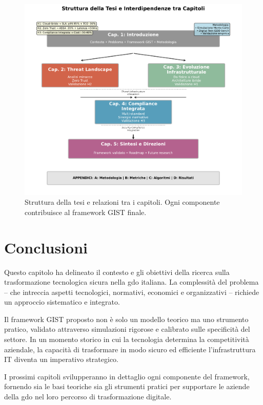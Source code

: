 \begin{figure}[htbp]
\centering
\includegraphics[width=\textwidth]{thesis_figures/cap1/fig_1_4_thesis_structure.pdf}
\caption{Struttura della tesi e relazioni tra i capitoli. Ogni componente contribuisce al framework GIST finale.}
\label{fig:thesis_structure}
\end{figure}

\section{\texorpdfstring{Conclusioni}{1.7 - Conclusioni}}
\label{sec:conclusioni_cap1}

Questo capitolo ha delineato il contesto e gli obiettivi della ricerca sulla trasformazione tecnologica sicura nella \gls{gdo} italiana. La complessità del problema – che intreccia aspetti tecnologici, normativi, economici e organizzativi – richiede un approccio sistematico e integrato.

Il framework GIST proposto non è solo un modello teorico ma uno strumento pratico, validato attraverso simulazioni rigorose e calibrato sulle specificità del settore. In un momento storico in cui la tecnologia determina la competitività aziendale, la capacità di trasformare in modo sicuro ed efficiente l'infrastruttura IT diventa un imperativo strategico.

I prossimi capitoli svilupperanno in dettaglio ogni componente del framework, fornendo sia le basi teoriche sia gli strumenti pratici per supportare le aziende della \gls{gdo} nel loro percorso di trasformazione digitale.

\clearpage
\printbibliography[
    heading=subbibliography,
    title={Riferimenti bibliografici del capitolo},
    segment=\therefsegment
]

